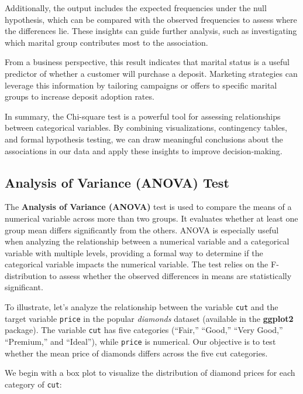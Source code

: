 \documentclass[
]{book}
\newcommand{\passthrough}[1]{#1}
\theoremstyle{definition}
\theoremstyle{definition}
\theoremstyle{definition}
\theoremstyle{definition}
\theoremstyle{remark}
\begin{document}
Additionally, the output includes the expected frequencies under the null hypothesis, which can be compared with the observed frequencies to assess where the differences lie. These insights can guide further analysis, such as investigating which marital group contributes most to the association.

From a business perspective, this result indicates that marital status is a useful predictor of whether a customer will purchase a deposit. Marketing strategies can leverage this information by tailoring campaigns or offers to specific marital groups to increase deposit adoption rates.

In summary, the Chi-square test is a powerful tool for assessing relationships between categorical variables. By combining visualizations, contingency tables, and formal hypothesis testing, we can draw meaningful conclusions about the associations in our data and apply these insights to improve decision-making.

\subsection{Analysis of Variance (ANOVA) Test}\label{analysis-of-variance-anova-test}

The \textbf{Analysis of Variance (ANOVA)} test is used to compare the means of a numerical variable across more than two groups. It evaluates whether at least one group mean differs significantly from the others. ANOVA is especially useful when analyzing the relationship between a numerical variable and a categorical variable with multiple levels, providing a formal way to determine if the categorical variable impacts the numerical variable. The test relies on the F-distribution to assess whether the observed differences in means are statistically significant.

To illustrate, let's analyze the relationship between the variable \passthrough{\lstinline!cut!} and the target variable \passthrough{\lstinline!price!} in the popular \emph{diamonds} dataset (available in the \textbf{ggplot2} package). The variable \passthrough{\lstinline!cut!} has five categories (``Fair,'' ``Good,'' ``Very Good,'' ``Premium,'' and ``Ideal''), while \passthrough{\lstinline!price!} is numerical. Our objective is to test whether the mean price of diamonds differs across the five cut categories.

We begin with a box plot to visualize the distribution of diamond prices for each category of \passthrough{\lstinline!cut!}:
\end{document}
